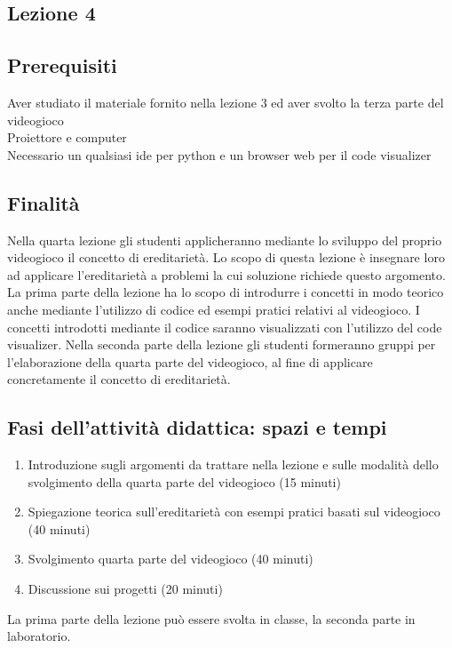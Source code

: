 \documentclass[12pt,a4paper]{article}
\begin{document}
\subsection{Lezione 4} 

\subsection*{Prerequisiti}
Aver studiato il materiale fornito nella lezione 3 ed aver svolto la terza parte del videogioco\\
Proiettore e computer\\
Necessario un qualsiasi ide per python e un browser web per il code visualizer



\subsection*{Finalità}
Nella quarta lezione gli studenti applicheranno mediante lo sviluppo del proprio videogioco il concetto di ereditarietà. Lo scopo di questa lezione è insegnare loro ad applicare l’ereditarietà a problemi la cui soluzione richiede questo argomento. La prima parte della lezione ha lo scopo di introdurre i concetti in modo teorico anche mediante l’utilizzo di codice ed esempi pratici relativi al videogioco. I concetti introdotti mediante il codice saranno visualizzati con l’utilizzo del code visualizer. Nella seconda parte della lezione gli studenti formeranno gruppi per l’elaborazione della quarta parte del videogioco, al fine di applicare concretamente il concetto di ereditarietà.


\subsection*{Fasi dell'attività didattica: spazi e tempi}

\begin{enumerate}
\item Introduzione sugli argomenti da trattare nella lezione e sulle modalità dello svolgimento della quarta parte del videogioco (15 minuti)
\item Spiegazione teorica sull’ereditarietà con esempi pratici basati sul videogioco (40 minuti)
\item Svolgimento quarta parte del videogioco (40 minuti)
\item Discussione sui progetti (20 minuti)

\end{enumerate}
La prima parte della lezione può essere svolta in classe, la seconda parte in laboratorio.
\end{document}
